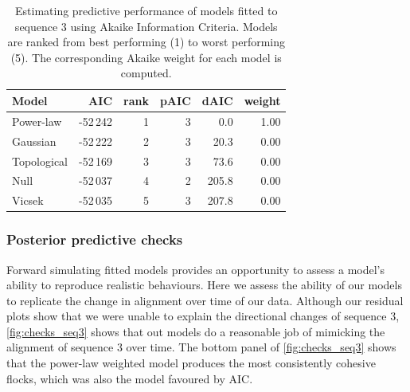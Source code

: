 \begin{table}[tbp]
\begin{tabular}{@{}lrrrrr@{}}
\toprule
Model                       &      AIC & rank & pAIC &  dAIC & weight \\
\midrule
Power-law                   & -52\,242 &    1 &  3 &   0.0 &   1.00 \\
Gaussian                    & -52\,222 &    2 &  3 &  20.3 &   0.00 \\
Topological                 & -52\,169 &    3 &  3 &  73.6 &   0.00 \\
Null                        & -52\,037 &    4 &  2 & 205.8 &   0.00 \\
Vicsek                      & -52\,035 &    5 &  3 & 207.8 &   0.00 \\
\bottomrule
\end{tabular}
\caption{Estimating predictive performance of models fitted to sequence 3
  using Akaike Information Criteria. Models are ranked from best performing (1)
  to worst performing (5). The corresponding Akaike weight for each model is
  computed.}
\label{tab:aic_seq3}
\end{table}

\subsubsection{Posterior predictive checks}

Forward simulating fitted models provides an opportunity to assess a model's
ability to reproduce realistic behaviours. Here we assess the ability of our
models to replicate the change in alignment over time of our data. Although our
residual plots show that we were unable to explain the directional changes of
sequence 3, \cref{fig:checks_seq3} shows that out models do a reasonable job
of mimicking the alignment of sequence 3 over time. The bottom panel of
\cref{fig:checks_seq3} shows that the power-law weighted model produces the most
consistently cohesive flocks, which was also the model favoured by AIC.

